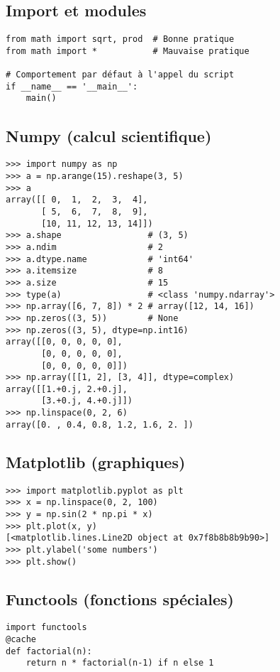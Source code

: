 \documentclass[9pt]{extarticle}
\begin{document}
\begin{multicols*}{4}
\section*{Import et modules}
\begin{lstlisting}
from math import sqrt, prod  # Bonne pratique
from math import *           # Mauvaise pratique

# Comportement par défaut à l'appel du script
if __name__ == '__main__':
    main()
\end{lstlisting}

\subsection*{Numpy (calcul scientifique)}
\begin{lstlisting}
>>> import numpy as np
>>> a = np.arange(15).reshape(3, 5)
>>> a
array([[ 0,  1,  2,  3,  4],
       [ 5,  6,  7,  8,  9],
       [10, 11, 12, 13, 14]])
>>> a.shape                 # (3, 5)
>>> a.ndim                  # 2
>>> a.dtype.name            # 'int64'
>>> a.itemsize              # 8
>>> a.size                  # 15
>>> type(a)                 # <class 'numpy.ndarray'>
>>> np.array([6, 7, 8]) * 2 # array([12, 14, 16])
>>> np.zeros((3, 5))        # None
>>> np.zeros((3, 5), dtype=np.int16)
array([[0, 0, 0, 0, 0],
       [0, 0, 0, 0, 0],
       [0, 0, 0, 0, 0]])
>>> np.array([[1, 2], [3, 4]], dtype=complex)
array([[1.+0.j, 2.+0.j],
       [3.+0.j, 4.+0.j]])
>>> np.linspace(0, 2, 6)
array([0. , 0.4, 0.8, 1.2, 1.6, 2. ])
\end{lstlisting}

\subsection*{Matplotlib (graphiques)}
\begin{lstlisting}
>>> import matplotlib.pyplot as plt
>>> x = np.linspace(0, 2, 100)
>>> y = np.sin(2 * np.pi * x)
>>> plt.plot(x, y)
[<matplotlib.lines.Line2D object at 0x7f8b8b8b9b90>]
>>> plt.ylabel('some numbers')
>>> plt.show()
\end{lstlisting}

\subsection*{Functools (fonctions spéciales)}
\begin{lstlisting}
import functools
@cache
def factorial(n):
    return n * factorial(n-1) if n else 1


\end{lstlisting}
\end{multicols*}
\end{document}
